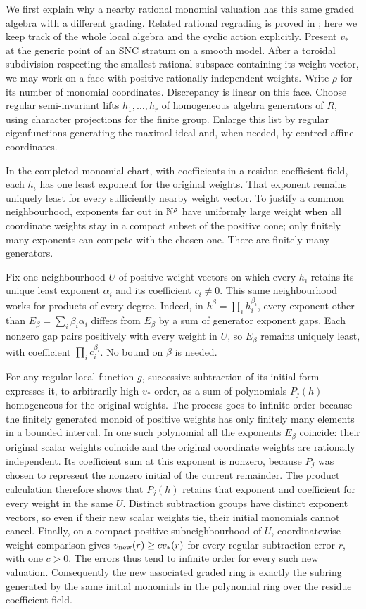 We first explain why a nearby rational monomial valuation has this same
graded algebra with a different grading. Related rational regrading is
proved in \cite[Lemma~2.10]{LiXuHigherRank}; here we keep track of the
whole local algebra and the cyclic action explicitly. Present $v_*$ at the generic
point of an SNC stratum on a smooth model.  After a toroidal subdivision
respecting the smallest rational subspace containing its weight vector,
we may work on a face with positive rationally independent weights.
Write $\rho$ for its number of monomial coordinates.  Discrepancy is
linear on this face.  Choose regular semi-invariant lifts
$h_1,\ldots,h_r$ of homogeneous algebra generators of $R$, using character
projections for the finite group.  Enlarge this list by regular
eigenfunctions generating the maximal ideal and, when needed, by centred
affine coordinates.

In the completed monomial chart, with coefficients in a residue
coefficient field, each $h_i$ has one least exponent for the original
weights.  That exponent remains uniquely least for every sufficiently
nearby weight vector.  To justify a common neighbourhood, exponents far
out in $\mathbb N^\rho$ have uniformly large weight when all coordinate weights
stay in a compact subset of the positive cone; only finitely many
exponents can compete with the chosen one.  There are finitely many
generators.

Fix one neighbourhood $U$ of positive weight vectors on which every
$h_i$ retains its unique least exponent $\alpha_i$ and its coefficient
$c_i\ne0$. This same neighbourhood works for products of every degree.
Indeed, in $h^\beta=\prod_i h_i^{\beta_i}$, every exponent other than
$E_\beta=\sum_i\beta_i\alpha_i$ differs from $E_\beta$ by a sum of
generator exponent gaps. Each nonzero gap pairs positively with every
weight in $U$, so $E_\beta$ remains uniquely least, with coefficient
$\prod_i c_i^{\beta_i}$. No bound on $\beta$ is needed.

For any regular local function $g$, successive subtraction of its
initial form expresses it, to arbitrarily high $v_*$-order, as a sum of
polynomials $P_j(h)$ homogeneous for the original weights. The process
goes to infinite order because the finitely generated monoid of positive
weights has only finitely many elements in a bounded interval. In one
such polynomial all the exponents $E_\beta$ coincide: their original
scalar weights coincide and the original coordinate weights are
rationally independent. Its coefficient sum at this exponent is nonzero,
because $P_j$ was chosen to represent the nonzero initial of the current
remainder. The product calculation therefore shows that $P_j(h)$ retains
that exponent and coefficient for every weight in the same $U$.
Distinct subtraction groups have distinct exponent vectors, so even if
their new scalar weights tie, their initial monomials cannot cancel.
Finally, on a compact positive subneighbourhood of $U$, coordinatewise
weight comparison gives $v_{\rm new}(r)\ge c v_*(r)$ for every regular
subtraction error $r$, with one $c>0$. The errors thus tend to infinite
order for every such new valuation. Consequently the new associated
graded ring is exactly the subring generated by the same initial
monomials in the polynomial ring over the residue coefficient field.

